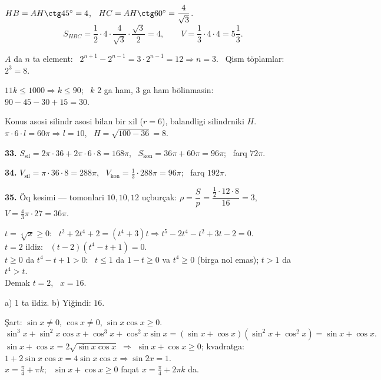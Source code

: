 $HB=AH\ctg45^\circ=4$, \ $HC=AH\ctg60^\circ=\dfrac4{\sqrt3}$.
\[S_{HBC}=\frac12\cdot4\cdot\frac4{\sqrt3}\cdot\frac{\sqrt3}2=4,\qquad V=\frac13\cdot4\cdot4=5\frac13.\]

$A$ da $n$ ta element: \ $2^{n+1}-2^{n-1}=3\cdot2^{n-1}=12\Rightarrow n=3$. \ Qism töplamlar: $2^3=8$.

$11k\le1000\Rightarrow k\le90$; \ $k$ 2 ga ham, 3 ga ham bölinmasin: \ $90-45-30+15=30$.

\newpage
{}
Konus asosi silindr asosi bilan bir xil ($r=6$), balandligi silindrniki $H$. \ $\pi\cdot6\cdot l=60\pi\Rightarrow l=10$, \ $H=\sqrt{100-36}=8$.

\textbf{33.} $S_{\text{sil}}=2\pi\cdot36+2\pi\cdot6\cdot8=168\pi$, \ $S_{\text{kon}}=36\pi+60\pi=96\pi$; \ farq $72\pi$.

\textbf{34.} $V_{\text{sil}}=\pi\cdot36\cdot8=288\pi$, \ $V_{\text{kon}}=\frac13\cdot288\pi=96\pi$; \ farq $192\pi$.

\textbf{35.} Öq kesimi — tomonlari $10,10,12$ uçburçak: $\rho=\dfrac S p=\dfrac{\frac12\cdot12\cdot8}{16}=3$, \ $V=\frac43\pi\cdot27=36\pi$.

\newpage
{}
$t=\sqrt[4]x\ge0$: \ $t^2+2t^4+2=(t^4+3)t\Rightarrow t^5-2t^4-t^2+3t-2=0$.\\
$t=2$ ildiz: \ $(t-2)\left(t^4-t+1\right)=0$.\\
$t\ge0$ da $t^4-t+1>0$: \ $t\le1$ da $1-t\ge0$ va $t^4\ge0$ (birga nol emas); $t>1$ da $t^4>t$.\\
Demak $t=2$, \ $x=16$.

a) 1 ta ildiz. \quad b) Yiğindi: $16$.

\newpage
{}
Şart: $\sin x\ne0$, $\cos x\ne0$, $\sin x\cos x\ge0$.
\[\sin^3x+\sin^2x\cos x+\cos^3x+\cos^2x\sin x=(\sin x+\cos x)(\sin^2x+\cos^2x)=\sin x+\cos x.\]
$\sin x+\cos x=2\sqrt{\sin x\cos x}$ $\Rightarrow$ $\sin x+\cos x\ge0$; kvadratga: $1+2\sin x\cos x=4\sin x\cos x\Rightarrow\sin2x=1$.\\
$x=\frac\pi4+\pi k$; \ $\sin x+\cos x\ge0$ faqat $x=\frac\pi4+2\pi k$ da.

